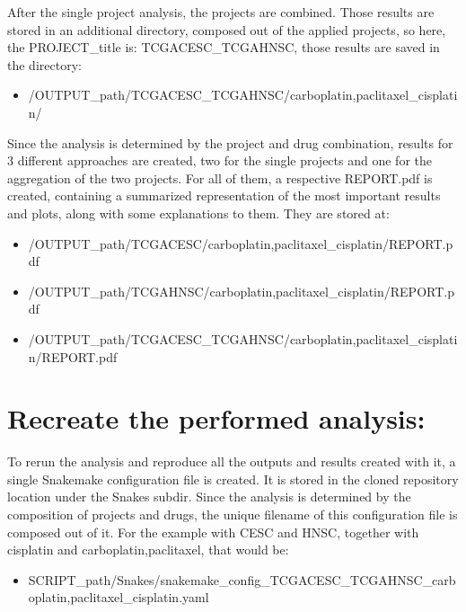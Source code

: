 \documentclass[letterpaper,10pt,english]{sphinxmanual}
\begin{document}
\sphinxAtStartPar
After the single project analysis, the projects are combined. Those results
are stored in an additional directory, composed out of the applied projects,
so here, the PROJECT\_title is: \textquotesingle{}TCGA\sphinxhyphen{}CESC\_TCGA\sphinxhyphen{}HNSC\textquotesingle{}, those results are saved
in the directory:
\begin{itemize}
\item {} 
\sphinxAtStartPar
/OUTPUT\_path/TCGA\sphinxhyphen{}CESC\_TCGA\sphinxhyphen{}HNSC/carboplatin,paclitaxel\_cisplatin/

\end{itemize}

\sphinxAtStartPar
Since the analysis is determined by the project and drug combination, results
for 3 different approaches are created, two for the single projects and one
for the aggregation of the two projects. For all of them, a respective
REPORT.pdf is created, containing a summarized representation of the most
important results and plots, along with some explanations to them. They are
stored at:
\begin{itemize}
\item {} 
\sphinxAtStartPar
/OUTPUT\_path/TCGA\sphinxhyphen{}CESC/carboplatin,paclitaxel\_cisplatin/REPORT.pdf

\item {} 
\sphinxAtStartPar
/OUTPUT\_path/TCGA\sphinxhyphen{}HNSC/carboplatin,paclitaxel\_cisplatin/REPORT.pdf

\item {} 
\sphinxAtStartPar
/OUTPUT\_path/TCGA\sphinxhyphen{}CESC\_TCGA\sphinxhyphen{}HNSC/carboplatin,paclitaxel\_cisplatin/REPORT.pdf

\end{itemize}


\section{Recreate the performed analysis:}
\label{\detokenize{index:recreate-the-performed-analysis}}
\sphinxAtStartPar
To rerun the analysis and reproduce all the outputs and results created with
it, a single Snakemake configuration file is created. It is stored in the
cloned repository location under the \textquotesingle{}Snakes\textquotesingle{} subdir.
Since the analysis is determined by the composition of projects and drugs, the
unique filename of this configuration file is composed out of it. For the
example with CESC and HNSC, together with cisplatin and carboplatin,paclitaxel,
that would be:
\begin{itemize}
\item {} 
\sphinxAtStartPar
SCRIPT\_path/Snakes/snakemake\_config\_TCGA\sphinxhyphen{}CESC\_TCGA\sphinxhyphen{}HNSC\_carboplatin,paclitaxel\_cisplatin.yaml

\end{itemize}
\end{document}
